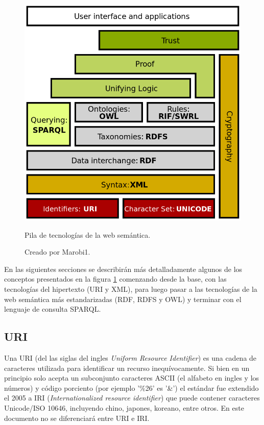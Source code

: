 \begin{figure}[htpb]
  \centering
  \includegraphics[width=.6\textwidth]{figures/Semantic_web_stack.png}
  \caption{Pila de tecnologías de la web semántica.}
  \vspace{-.25cm}
  \caption*{Creado por Marobi1\cite{wikimg:swstack}.}
  \label{fig:swstack}
\end{figure}

En las siguientes secciones se describirán más detalladamente algunos de los
conceptos presentados en la figura \ref{fig:swstack} comenzando desde la base,
con las tecnologías del hipertexto (URI y XML), para luego pasar a las
tecnologías de la web semántica más estandarizadas (RDF, RDFS y OWL) y terminar
con el lenguaje de consulta SPARQL.

\subsection{URI}
Una URI (del las siglas del ingles \emph{Uniform Resource Identifier}) es una
cadena de caracteres utilizada para identificar un recurso inequívocamente.
Si bien en un principio solo acepta un subconjunto caracteres ASCII (el alfabeto
en ingles y los números) y código porciento (por ejemplo '\%26' es '\&') el
estándar fue extendido el 2005 a IRI (\emph{Internationalized resource
identifier}) que puede contener caracteres Unicode/ISO 10646, incluyendo chino,
japones, koreano, entre otros\cite{gangemi2006bourne}. En este documento no se
diferenciará entre URI e IRI.

